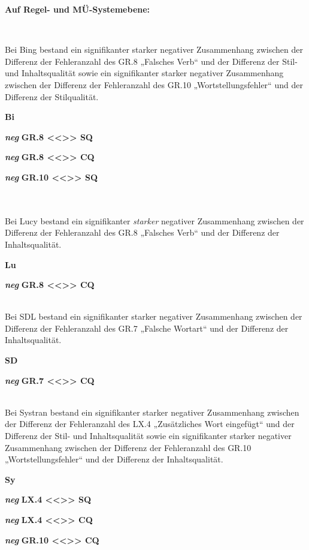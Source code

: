 \noindent
\parbox[t]{.7\textwidth}{\textbf{Auf Regel- und MÜ-Systemebene:}}\\
\parbox[t]{.7\textwidth}{
Bei Bing bestand ein signifikanter starker negativer Zusammenhang zwischen der Differenz der Fehleranzahl des GR.8 „Falsches Verb“ und der Differenz der Stil- und Inhaltsqualität
sowie ein signifikanter starker negativer Zusammenhang zwischen der Differenz der Fehleranzahl des GR.10 „Wortstellungsfehler“ und der Differenz der Stilqualität.
}
\parbox[t]{.04\textwidth}{}
\colorbox{smGreen}{\parbox[t]{.25\textwidth}{
{ \textbf{Bi}}

{ \textbf{\textit{neg}} \textbf{GR.8 <{}<{}>{}> SQ}}

{ \textbf{\textit{neg}} \textbf{GR.8 <{}<{}>{}> CQ}}

{ \textbf{\textit{neg}} \textbf{GR.10 <{}<{}>{}> SQ}}\\
\\
\\
}}

\medskip
\noindent
\parbox[t]{.7\textwidth}{
Bei Lucy bestand ein signifikanter \textit{starker} negativer Zusammenhang zwischen der Differenz der Fehleranzahl des GR.8 „Falsches Verb“ und der Differenz der Inhaltsqualität.
}
\parbox[t]{.04\textwidth}{}
\colorbox{smGreen}{\parbox[t]{.25\textwidth}{
{ \textbf{Lu}}

{ \textbf{\textit{neg}} \textbf{GR.8 <{}<{}>{}> CQ}}\\
\\
}}

\medskip
\noindent
\parbox[t]{.7\textwidth}{
Bei SDL bestand ein signifikanter starker negativer Zusammenhang zwischen der Differenz der Fehleranzahl des GR.7 „Falsche Wortart“ und der Differenz der Inhaltsqualität.
}
\parbox[t]{.04\textwidth}{}
\colorbox{smGreen}{\parbox[t]{.25\textwidth}{
{ \textbf{SD}}

{ \textbf{\textit{neg}} \textbf{GR.7 <{}<{}>{}> CQ}}\\
\\
}}

\medskip
\noindent
\parbox[t]{.7\textwidth}{
Bei Systran bestand ein signifikanter starker negativer Zusammenhang zwischen der Differenz der Fehleranzahl des LX.4 „Zusätzliches Wort eingefügt“ und der Differenz der Stil- und Inhaltsqualität
sowie ein signifikanter starker negativer Zusammenhang zwischen der Differenz der Fehleranzahl des GR.10 „Wortstellungsfehler“ und der Differenz der Inhaltsqualität.
}
\parbox[t]{.04\textwidth}{}
\colorbox{smGreen}{\parbox[t]{.25\textwidth}{
{ \textbf{Sy}}

{ \textbf{\textit{neg}} \textbf{LX.4 <{}<{}>{}> SQ}}

{ \textbf{\textit{neg}} \textbf{LX.4 <{}<{}>{}> CQ}}

{ \textbf{\textit{neg}} \textbf{GR.10 <{}<{}>{}> CQ}}\\
\\
\\
}}

